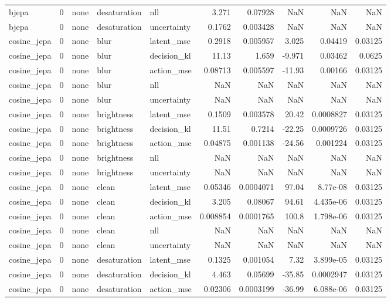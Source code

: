 \begin{tabular}{lrlllrrrrr}
bjepa & 0 & none & desaturation & nll & 3.271 & 0.07928 & NaN & NaN & NaN \\
bjepa & 0 & none & desaturation & uncertainty & 0.1762 & 0.003428 & NaN & NaN & NaN \\
cosine\_jepa & 0 & none & blur & latent\_mse & 0.2918 & 0.005957 & 3.025 & 0.04419 & 0.03125 \\
cosine\_jepa & 0 & none & blur & decision\_kl & 11.13 & 1.659 & -9.971 & 0.03462 & 0.0625 \\
cosine\_jepa & 0 & none & blur & action\_mse & 0.08713 & 0.005597 & -11.93 & 0.00166 & 0.03125 \\
cosine\_jepa & 0 & none & blur & nll & NaN & NaN & NaN & NaN & NaN \\
cosine\_jepa & 0 & none & blur & uncertainty & NaN & NaN & NaN & NaN & NaN \\
cosine\_jepa & 0 & none & brightness & latent\_mse & 0.1509 & 0.003578 & 20.42 & 0.0008827 & 0.03125 \\
cosine\_jepa & 0 & none & brightness & decision\_kl & 11.51 & 0.7214 & -22.25 & 0.0009726 & 0.03125 \\
cosine\_jepa & 0 & none & brightness & action\_mse & 0.04875 & 0.001138 & -24.56 & 0.001224 & 0.03125 \\
cosine\_jepa & 0 & none & brightness & nll & NaN & NaN & NaN & NaN & NaN \\
cosine\_jepa & 0 & none & brightness & uncertainty & NaN & NaN & NaN & NaN & NaN \\
cosine\_jepa & 0 & none & clean & latent\_mse & 0.05346 & 0.0004071 & 97.04 & 8.77e-08 & 0.03125 \\
cosine\_jepa & 0 & none & clean & decision\_kl & 3.205 & 0.08067 & 94.61 & 4.435e-06 & 0.03125 \\
cosine\_jepa & 0 & none & clean & action\_mse & 0.008854 & 0.0001765 & 100.8 & 1.798e-06 & 0.03125 \\
cosine\_jepa & 0 & none & clean & nll & NaN & NaN & NaN & NaN & NaN \\
cosine\_jepa & 0 & none & clean & uncertainty & NaN & NaN & NaN & NaN & NaN \\
cosine\_jepa & 0 & none & desaturation & latent\_mse & 0.1325 & 0.001054 & 7.32 & 3.899e-05 & 0.03125 \\
cosine\_jepa & 0 & none & desaturation & decision\_kl & 4.463 & 0.05699 & -35.85 & 0.0002947 & 0.03125 \\
cosine\_jepa & 0 & none & desaturation & action\_mse & 0.02306 & 0.0003199 & -36.99 & 6.088e-06 & 0.03125 \\

\end{tabular}
